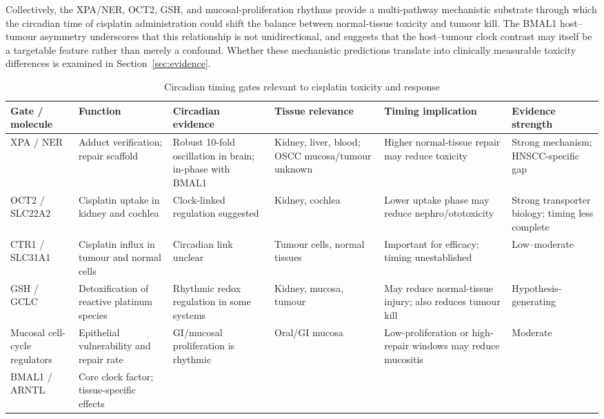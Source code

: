 \documentclass[preprint,review,12pt]{elsarticle}
\renewcommand{\arraystretch}{1.18}
\newenvironment{compactsidewaystable}
  {\begin{table}\centering\scriptsize
   \setlength{\tabcolsep}{3pt}\renewcommand{\arraystretch}{1.08}}
  {\end{table}}
\begin{document}
Collectively, the XPA/NER, OCT2, GSH, and mucosal-proliferation rhythms
provide a multi-pathway mechanistic substrate through which the circadian
time of cisplatin administration could shift the balance between normal-tissue
toxicity and tumour kill.  The BMAL1 host--tumour asymmetry underscores that
this relationship is not unidirectional, and suggests that the host--tumour
clock contrast may itself be a targetable feature rather than merely a
confound.  Whether these mechanistic predictions translate into clinically
measurable toxicity differences is examined in Section~\ref{sec:evidence}.

\begin{compactsidewaystable}
\caption{Circadian timing gates relevant to cisplatin toxicity and response}
\label{tab:gates}
\begin{tabularx}{0.95\textheight}{L{2.4cm} Y Y L{2.2cm} Y L{2.2cm}}
\toprule
\textbf{Gate / molecule} & \textbf{Function} & \textbf{Circadian evidence} &
  \textbf{Tissue relevance} & \textbf{Timing implication} &
  \textbf{Evidence strength} \\
\midrule
XPA / NER &
  Adduct verification; repair scaffold &
  Robust 10-fold oscillation in brain; in-phase with BMAL1 &
  Kidney, liver, blood; OSCC mucosa/tumour unknown &
  Higher normal-tissue repair may reduce toxicity &
  Strong mechanism; HNSCC-specific gap \\
\addlinespace
OCT2 / SLC22A2 &
  Cisplatin uptake in kidney and cochlea &
  Clock-linked regulation suggested &
  Kidney, cochlea &
  Lower uptake phase may reduce nephro/ototoxicity &
  Strong transporter biology; timing less complete \\
\addlinespace
CTR1 / SLC31A1 &
  Cisplatin influx in tumour and normal cells &
  Circadian link unclear &
  Tumour cells, normal tissues &
  Important for efficacy; timing unestablished &
  Low--moderate \\
\addlinespace
GSH / GCLC &
  Detoxification of reactive platinum species &
  Rhythmic redox regulation in some systems &
  Kidney, mucosa, tumour &
  May reduce normal-tissue injury; also reduces tumour kill &
  Hypothesis-generating \\
\addlinespace
Mucosal cell-cycle regulators &
  Epithelial vulnerability and repair rate &
  GI/mucosal proliferation is rhythmic &
  Oral/GI mucosa &
  Low-proliferation or high-repair windows may reduce mucositis &
  Moderate \\
\addlinespace
BMAL1 / ARNTL &
  Core clock factor; tissue-specific effects &

\end{tabularx}
\end{compactsidewaystable}
\end{document}
